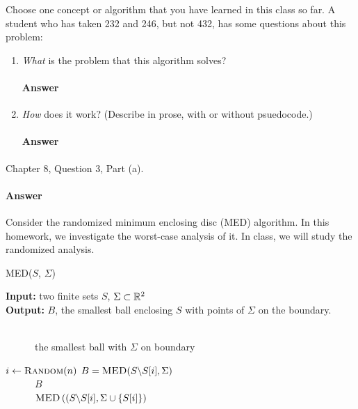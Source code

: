 \documentclass{article}
\begin{document}
\collab{\todo{}}

Choose one concept or algorithm that you have learned
in this class so far. A student who has
taken 232 and 246, but not 432, has some questions about this problem:

\begin{enumerate}
    \item \emph{What} is the problem that this algorithm solves?

        \paragraph{Answer}
        \todo{}

    \item \emph{How} does it work? (Describe in prose, with or without
        psuedocode.)

        \paragraph{Answer}
        \todo{}

\end{enumerate}


\collab{\todo{}}

Chapter 8, Question 3, Part (a).

\paragraph{Answer}

\collab{\todo{}}
Consider the randomized minimum enclosing disc (MED) algorithm.  In this
homework, we investigate the worst-case analysis of it.  In class, we will study
the randomized analysis.

\begin{algorithm}\caption{\textsc{MED($S$, $\Sigma$)}}\label{alg:seb}
    {\bf Input:} two finite sets $S$, $\Sigma \subset {\mathbb R}^2$\\
    {\bf Output:} $B$, the smallest ball enclosing $S$ with points of
    $\Sigma$ on the boundary.

    \begin{algorithmic}[1]
        \\
        ~~~~~~\Return the smallest ball with $\Sigma$ on boundary
        \EndIf

        \State $i \gets \textsc{Random}(n)$
        \State $B = \textsc{MED}(S \backslash S[i], \Sigma)$
        \\
        ~~~~~~\Return $B$
        \Else\\
        ~~~~~~\Return $\textsc{MED}\left((S \backslash S[i], \Sigma \cup \{ S[i]
        \}\right)$
        \EndIf
    \end{algorithmic}
\end{algorithm}
\end{document}
